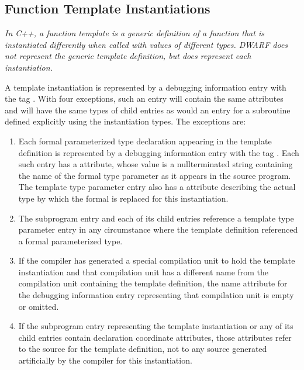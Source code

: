\subsection{Function Template Instantiations}
\label{chap:functiontemplateinstantiations}

\textit{In C++, a function template is a generic definition of
a function that is instantiated differently when called with
values of different types. DWARF does not represent the generic
template definition, but does represent each instantiation.}

A template instantiation is represented by a debugging
information entry with the tag . With four
exceptions, such an entry will contain the same attributes and
will have the same types of child entries as would an entry
for a subroutine defined explicitly using the instantiation
types. The exceptions are:

\begin{enumerate}[1.]
\item Each formal parameterized type declaration appearing in the
template definition is represented by a debugging information
entry with the 
tag . 
Each
such entry has a  attribute, whose value is a
null\dash terminated string containing the name of the formal
type parameter as it appears in the source program. The
template type parameter entry also has a  attribute
describing the actual type by which the formal is replaced
for this instantiation.

\item The subprogram entry and each of its child entries reference
a template type parameter entry in any circumstance where
the template definition referenced a formal parameterized type.

\item If the compiler has generated a special compilation unit
to hold the template instantiation and that compilation unit
has a different name from the compilation unit containing
the template definition, the name attribute for the debugging
information entry representing that compilation unit is empty
or omitted.

\item If the subprogram entry representing the template
instantiation or any of its child entries contain declaration
coordinate attributes, those attributes refer to the source
for the template definition, not to any source generated
artificially by the compiler for this instantiation.
\end{enumerate}



